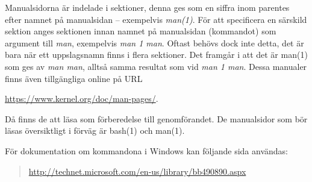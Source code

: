 Manualsidorna är indelade i sektioner, denna ges som en siffra inom parentes 
efter namnet på manualsidan -- exempelvis \emph{man(1)}.
För att specificera en särskild sektion anges sektionen innan namnet på 
manualsidan (kommandot) som argument till \emph{man}, exempelvis \emph{man 
1 man}.
Oftast behövs dock inte detta, det är bara när ett uppslagsnamn finns i flera 
sektioner.
Det framgår i  att det är man(1) som ges av \emph{man 
man}, alltså samma resultat som vid \emph{man 1 man}.
Dessa manualer finns även tillgängliga online på URL
\begin{center}
	\url{https://www.kernel.org/doc/man-pages/}.
\end{center}
Då finns de att läsa som förberedelse till genomförandet.
De manualsidor som bör läsas översiktligt i förväg är bash(1) och man(1).

För dokumentation om kommandona i Windows kan följande sida användas:
\begin{quote}
	\url{http://technet.microsoft.com/en-us/library/bb490890.aspx}
\end{quote}
